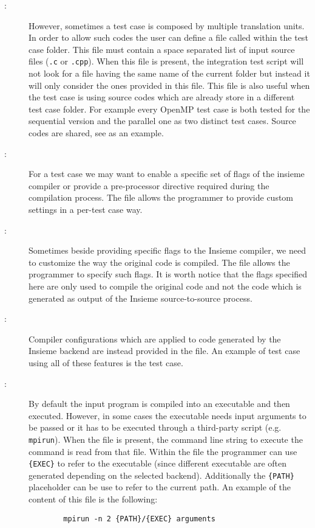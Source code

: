 \begin{description}

	\item[:]
		However, sometimes a test case is composed by multiple translation units. In
		order to allow such codes the user can define a file called 
		within the test case folder. This file must contain a space separated list of
		input source files ({\tt .c} or {\tt .cpp}). When this file is present, the
		integration test script will not look for a file having the same name of the
		current folder but instead it will only consider the ones provided in this
		file. This file is also useful when the test case is using source codes
		which are already store in a different test case folder. For example every
		OpenMP test case is both tested for the sequential version and the
		parallel one as two distinct test cases. Source codes are shared, see
		 as an example. 

	\item[:] For a test case we may want to enable a specific
		set of flags of the insieme compiler or provide a pre-processor directive
		required during the compilation process. The file 
		allows the programmer to provide custom settings in a per-test case way. 

	\item[:] Sometimes beside providing specific flags to the
		Insieme compiler, we need to customize the way the original code is
		compiled. The file  allows the programmer to specify
		such flags. It is worth notice that the flags specified here are only used
		to compile the original code and not the code which is generated as output
		of the Insieme source-to-source process. 

	\item[:] Compiler configurations which are applied
		to code generated by the Insieme backend are instead provided in the
		 file. An example of test case using all of these
		features is the  test case. 

	\item[:] By default the input program is compiled into an
		executable and then executed. However, in some cases the executable needs
		input arguments to be passed or it has to be executed through a
		third-party script (e.g. {\tt mpirun}). When the file  is
		present, the command line string to execute the command is read from that
		file. Within the file the programmer can use {\tt \{EXEC\}} to refer to
		the executable (since different executable are often generated depending
		on the selected backend). Additionally the {\tt \{PATH\}} placeholder can
		be use to refer to the current path. An example of the content of this
		file is the following: 
		\begin{verbatim} 
		mpirun -n 2 {PATH}/{EXEC} arguments
		\end{verbatim} 


\end{description}
